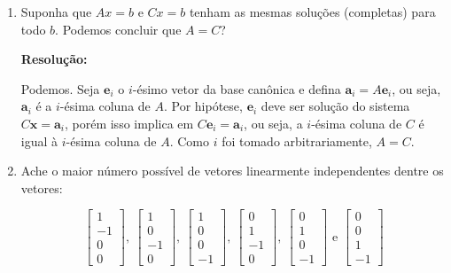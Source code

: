 \documentclass[leqno]{article}
\numberwithin{equation}{section}
\newcommand{\bfe}{\mathbf{e}}
\newcommand{\bfa}{\mathbf{a}}
\newcommand{\bfx}{\mathbf{x}}
\newcommand{\bvecfour}[4]{%
    \begin{bmatrix} #1 \\ #2 \\ #3 \\ #4 \end{bmatrix}
}
\newenvironment{sol}
{
    \vspace{4mm}
    \noindent\textbf{Resolução:}
    \strut\newline
    \smallskip
    \hspace{-3.5mm}
}
{}
\begin{document}
\begin{enumerate}
    \item Suponha que $Ax = b$ e $Cx = b$ tenham as mesmas soluções (completas) para todo $b$. Podemos concluir que $A = C$?

        \begin{sol} 
            Podemos.
            Seja \( \bfe_{ i } \) o \( i \)-ésimo vetor da base canônica e defina \( \bfa_{ i } = A \bfe_{ i } \), ou seja, \( \bfa_{ i } \) é a \( i \)-ésima coluna de \( A \).
            Por hipótese, \( \bfe_{ i } \) deve ser solução do sistema \( C \bfx = \bfa_{ i } \), porém isso implica em \( C \bfe_{ i } = \bfa_{ i } \), ou seja, a \( i \)-ésima coluna de \( C \) é igual à \( i \)-ésima coluna de \( A \).
            Como \( i \) foi tomado arbitrariamente, \( A = C \).
        \end{sol} 

    \item Ache o maior número possível de vetores linearmente independentes dentre os vetores:

        $$\bvecfour{1}{-1}{0}{0}, \ \bvecfour{1}{0}{-1}{0}, \ \bvecfour{1}{0}{0}{-1}, \ \bvecfour{0}{1}{-1}{0}, \ \bvecfour{0}{1}{0}{-1} \mbox{ e } \bvecfour{0}{0}{1}{-1}$$


\end{enumerate}
\end{document}
